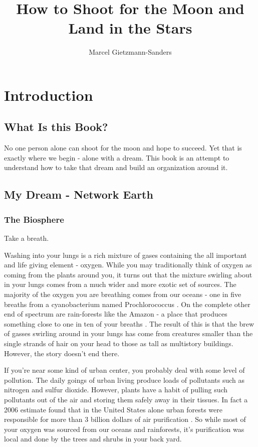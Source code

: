 \documentclass[11pt,a5paper]{book}
\title{How to Shoot for the Moon and Land in the Stars}
\author{Marcel Gietzmann-Sanders}
\date{}
\begin{document}
\maketitle
\tableofcontents
\newpage
\part{Introduction}
\chapter{What Is this Book?}
No one person alone can shoot for the moon and hope to succeed. Yet that is exactly where we begin - alone with a dream. This book is an attempt to understand how to take that dream and build an organization around it.
\chapter{My Dream - Network Earth}
\section{The Biosphere}
Take a breath. 
\newline

Washing into your lungs is a rich mixture of gases containing the all important and life giving element - oxygen. While you may traditionally think of oxygen as coming from the plants around you, it turns out that the mixture swirling about in your lungs comes from a much wider and more exotic set of sources. The majority of the oxygen you are breathing comes from our oceans - one in five breaths from a cyanobacterium named Prochlorococcus \cite{kmorsink}. On the complete other end of spectrum are rain-forests like the Amazon - a place that produces something close to one in ten of your breaths \cite{ymalhi}. The result of this is that the brew of gasses swirling around in your lungs has come from creatures smaller than the single strands of hair on your head to those as tall as multistory buildings. However, the story doesn't end there.
\newline

If you're near some kind of urban center, you probably deal with some level of pollution. The daily goings of urban living produce loads of pollutants such as nitrogen and sulfur dioxide. However, plants have a habit of pulling such pollutants out of the air and storing them safely away in their tissues. In fact a 2006 estimate found that in the United States alone urban forests were responsible for more than 3 billion dollars of air purification \cite{dnowak}. So while most of your oxygen was sourced from our oceans and rainforests, it's purification was local and done by the trees and shrubs in your back yard. 
\newline
\end{document}

